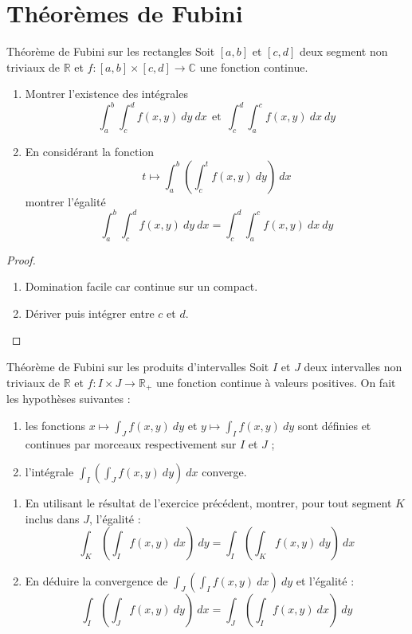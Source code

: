 \documentclass[french,a4paper]{article}
\newcommand{\R}{\mathbb{R}}
\newcommand{\C}{\mathbb{C}}
\theoremstyle{plain}
\theoremstyle{definition}
\theoremstyle{remark}
\begin{document}
\section{Théorèmes de Fubini}

\begin{ex}[Moulin.IP.33]{Théorème de Fubini sur les rectangles}
	Soit $[a,b]$ et $[c,d]$ deux segment non triviaux de $\R$ et $f:[a,b]\times[c,d]\to\C$ une fonction continue.
	\begin{enumerate}
		\item Montrer l'existence des intégrales $$\int_{a}^{b}\int_{c}^{d}f(x,y)\ dy\ dx \ \ \text{et} \ \ \int_{c}^{d}\int_{a}^{c}f(x,y)\ dx\ dy$$
		\item En considérant la fonction $$t\mapsto \int_{a}^{b}\left(\int_{c}^{t}f(x,y)\ dy\right)\ dx$$ montrer l'égalité $$\int_{a}^{b}\int_{c}^{d}f(x,y)\ dy\ dx =\int_{c}^{d}\int_{a}^{c}f(x,y)\ dx\ dy$$
	\end{enumerate}
\end{ex}
\begin{proof}
	\begin{enumerate}
		\item Domination facile car continue sur un compact.
		\item Dériver puis intégrer entre $c$ et $d$.
	\end{enumerate}
\end{proof}

\begin{ex}[Moulin.IP.34]{Théorème de Fubini sur les produits d'intervalles}
	Soit $I$ et $J$ deux intervalles non triviaux de $\R$ et $f:I\times J\to\R_+$ une fonction continue à valeurs positives. On fait les hypothèses suivantes : 
	\begin{enumerate}[label=(\roman*)]
		\item les fonctions $x\mapsto\displaystyle\int_J f(x,y)\ dy$ et $y\mapsto\displaystyle\int_I f(x,y)\ dy$ sont définies et continues par morceaux respectivement sur $I$ et $J$ ;
		\item l'intégrale $\displaystyle\int_I\left(\int_J f(x,y)\ dy\right)\ dx$ converge.
	\end{enumerate}
	\begin{enumerate}
		\item En utilisant le résultat de l'exercice précédent, montrer, pour tout segment $K$ inclus dans $J$, l'égalité : $$\int_K\left(\int_I f(x,y)\ dx\right)\ dy=\int_I\left(\int_K f(x,y)\ dy\right)\ dx$$
		\item En déduire la convergence de $\displaystyle\int_J\left(\int_I f(x,y)\ dx\right)\ dy$ et l'égalité : $$\int_I\left(\int_J f(x,y)\ dy\right)\ dx=\int_J\left(\int_I f(x,y)\ dx\right)\ dy$$
	\end{enumerate}
\end{ex}
\end{document}
